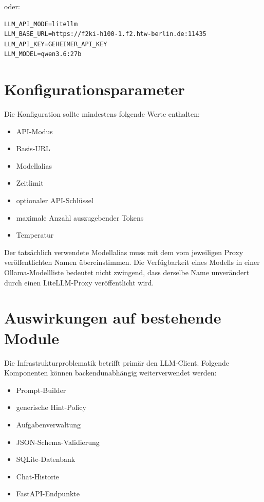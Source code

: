 \documentclass[11pt,a4paper,oneside,ngerman]{memoir}
\begin{document}
oder:

\begin{verbatim}
LLM_API_MODE=litellm
LLM_BASE_URL=https://f2ki-h100-1.f2.htw-berlin.de:11435
LLM_API_KEY=GEHEIMER_API_KEY
LLM_MODEL=qwen3.6:27b
\end{verbatim}

\section{Konfigurationsparameter}

Die Konfiguration sollte mindestens folgende Werte enthalten:

\begin{itemize}
    \item API-Modus
    \item Basis-URL
    \item Modellalias
    \item Zeitlimit
    \item optionaler API-Schlüssel
    \item maximale Anzahl auszugebender Tokens
    \item Temperatur
\end{itemize}

Der tatsächlich verwendete Modellalias muss mit dem vom jeweiligen Proxy veröffentlichten Namen übereinstimmen. Die Verfügbarkeit eines Modells in einer Ollama-Modellliste bedeutet nicht zwingend, dass derselbe Name unverändert durch einen LiteLLM-Proxy veröffentlicht wird.

\section{Auswirkungen auf bestehende Module}

Die Infrastrukturproblematik betrifft primär den LLM-Client. Folgende Komponenten können backendunabhängig weiterverwendet werden:

\begin{itemize}
    \item Prompt-Builder
    \item generische Hint-Policy
    \item Aufgabenverwaltung
    \item JSON-Schema-Validierung
    \item SQLite-Datenbank
    \item Chat-Historie
    \item FastAPI-Endpunkte
\end{itemize}
\end{document}
